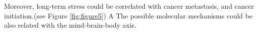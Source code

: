 \documentclass[12pt, a4paper]{article}
\begin{document}
Moreover, long-term stress could be correlated with cancer metastasis\citep{Lutgendorf2010}\citep{Moreno-Smith2010}\citep{Du2020}\citep{Xu2021},
and cancer initiation\citep{Lutgendorf2010}\citep{Powell2013}\citep{Iftikhar2021}.(see Figure \ref{fig:figure5}) %
A%
The possible molecular mechanisms could be also related with the mind-brain-body axis\citep{Berens2017}.
\end{document}
